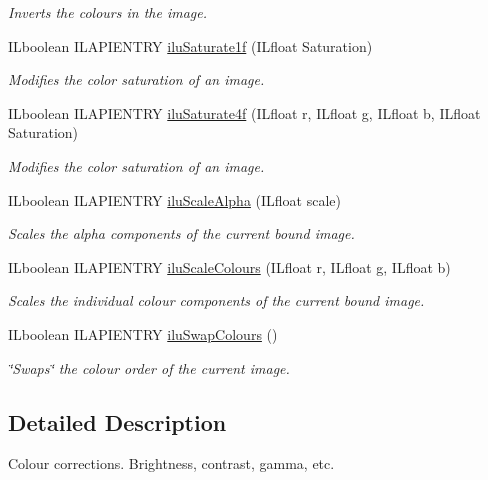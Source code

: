\begin{DoxyCompactItemize}
\begin{DoxyCompactList}\small\item\em Inverts the colours in the image. \end{DoxyCompactList}\item 
I\-Lboolean I\-L\-A\-P\-I\-E\-N\-T\-R\-Y \hyperlink{group__ilu__colour_gaa8f7b3bdc21492fddac12dd823051c3b}{ilu\-Saturate1f} (I\-Lfloat Saturation)
\begin{DoxyCompactList}\small\item\em Modifies the color saturation of an image. \end{DoxyCompactList}\item 
I\-Lboolean I\-L\-A\-P\-I\-E\-N\-T\-R\-Y \hyperlink{group__ilu__colour_gac117ee194f9075d2600f147e08a59251}{ilu\-Saturate4f} (I\-Lfloat r, I\-Lfloat g, I\-Lfloat b, I\-Lfloat Saturation)
\begin{DoxyCompactList}\small\item\em Modifies the color saturation of an image. \end{DoxyCompactList}\item 
I\-Lboolean I\-L\-A\-P\-I\-E\-N\-T\-R\-Y \hyperlink{group__ilu__colour_ga12f99569c175ef8b6f26c7713703380c}{ilu\-Scale\-Alpha} (I\-Lfloat scale)
\begin{DoxyCompactList}\small\item\em Scales the alpha components of the current bound image. \end{DoxyCompactList}\item 
I\-Lboolean I\-L\-A\-P\-I\-E\-N\-T\-R\-Y \hyperlink{group__ilu__colour_ga59c222c85f299a8bf12206dfd86646b8}{ilu\-Scale\-Colours} (I\-Lfloat r, I\-Lfloat g, I\-Lfloat b)
\begin{DoxyCompactList}\small\item\em Scales the individual colour components of the current bound image. \end{DoxyCompactList}\item 
I\-Lboolean I\-L\-A\-P\-I\-E\-N\-T\-R\-Y \hyperlink{group__ilu__colour_gad18047843d546f50472e0f0af80f2ad8}{ilu\-Swap\-Colours} ()
\begin{DoxyCompactList}\small\item\em \char`\"{}\-Swaps\char`\"{} the colour order of the current image. \end{DoxyCompactList}\end{DoxyCompactItemize}


\subsection{Detailed Description}
Colour corrections. Brightness, contrast, gamma, etc. 

